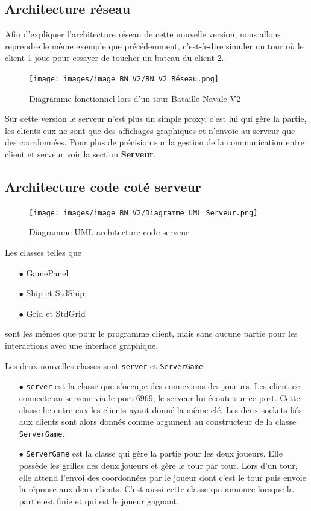 \documentclass[12pt]{article}
\begin{document}
\subsection{Architecture réseau}
Afin d'expliquer l'architecture réseau de cette nouvelle version, nous allons
reprendre le même exemple que
précédemment, c'est-à-dire simuler un tour où le client
1 joue pour essayer de toucher un bateau du client 2.
\bigskip
\begin{figure}[H]
      \centering
      \texttt{[image: images/image BN V2/BN V2 Réseau.png]}
      \caption{Diagramme fonctionnel lors d'un tour Bataille Navale V2}
\end{figure}
Sur cette version le serveur n'est plus un simple proxy, c'est lui qui gère la
partie, les clients eux ne sont que des affichages graphiques et n'envoie au
serveur que des coordonnées. Pour plus de précision sur la gestion de la
communication entre client et serveur voir la section \textbf{Serveur}.
\bigskip
\subsection{Architecture code coté serveur}
\begin{figure}[H]
      \centering
      \texttt{[image: images/image BN V2/Diagramme UML
            Serveur.png]}
      \caption{Diagramme UML architecture code serveur}
\end{figure}
\bigskip
Les classes telles que
\begin{itemize}
      \item[$\bullet$] GamePanel
      \item[$\bullet$] Ship et StdShip
      \item[$\bullet$] Grid et StdGrid
\end{itemize}
sont les mêmes que pour le programme client, mais sans aucune partie pour les
interactions avec une interface graphique.

\bigskip

Les deux nouvelles classes sont \texttt{server} et \texttt{ServerGame}
\begin{itemize}
      \item[$\bullet$] \texttt{server} est la classe que s'occupe des
            connexions des
            joueurs. Les client ce connecte au serveur via le port 6969, le
            serveur lui écoute sur ce port.
            Cette classe lie entre eux les clients ayant donné la même clé.
            Les deux sockets liés aux clients sont alors donnés comme argument
            au constructeur de la classe \texttt{ServerGame}.
      \item[$\bullet$] \texttt{ServerGame} est la classe qui gère la partie
            pour les deux joueurs. Elle possède les grilles des deux joueurs et
            gère le
            tour par tour. Lors d'un tour, elle attend l'envoi des coordonnées
            par le
            joueur dont c'est le tour puis envoie la réponse aux deux clients.
            C'est aussi
            cette classe qui annonce lorsque la partie est finie et qui est le
            joueur
            gagnant.
\end{itemize}
\end{document}
